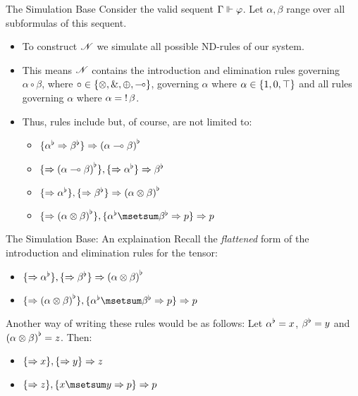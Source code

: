 \documentclass{beamer}
\begin{document}
\begin{frame}{The Simulation Base}
	Consider the valid sequent $\Gamma \Vdash_{ \!\! }^{ \!\! } \varphi$. Let $\alpha, \beta$ range over all subformulas of this sequent.
	\begin{itemize}
		\item To construct $\mathscr{N}$ we simulate all possible ND-rules of our system. 
		\item This means $\mathscr{N}$ contains the introduction and elimination rules governing $\alpha\circ\beta$, where $\circ \in \{\otimes,\mathbin{\&},\oplus,\multimap\}$, governing $\alpha$ where $\alpha \in \{1, 0, \top\}$ and all rules governing $\alpha$ where $\alpha = \mathop{!} \beta$.
		\item Thus, rules include but, of course, are not limited to:
		\begin{itemize}
			\item $\{ {\alpha}^{\flat} \Rightarrow {\beta}^{\flat} \} \Rightarrow {(\alpha \multimap\beta)}^{\flat}$
        	\item $\{ \Rightarrow {(\alpha \multimap\beta)}^{\flat}\}, \{ \Rightarrow {\alpha}^{\flat}\} \Rightarrow {\beta}^{\flat}$
        	\item $\{ \Rightarrow {\alpha}^{\flat}\}, \{\Rightarrow {\beta}^{\flat}\} \Rightarrow {(\alpha \otimes\beta)}^{\flat}$
        	\item $\openaddrule\seq \flatILL{ (\alpha \mand \beta) }\closeaddrule, \openaddrule\flatILL{\alpha}\msetsum \flatILL{\beta} \seq p\closeaddrule \seq p$
		\end{itemize}
	\end{itemize}
\end{frame}
\begin{frame}{The Simulation Base: An explaination}
	Recall the \emph{flattened} form of the introduction and elimination rules for the tensor:
	\begin{itemize}
		\item $\{ \Rightarrow {\alpha}^{\flat}\}, \{\Rightarrow {\beta}^{\flat}\} \Rightarrow {(\alpha \otimes\beta)}^{\flat}$
		\item $\openaddrule\seq \flatILL{ (\alpha \mand \beta) }\closeaddrule, \openaddrule\flatILL{\alpha}\msetsum \flatILL{\beta} \seq p\closeaddrule \seq p$
	\end{itemize}
	\pause
	\vspace{10pt}
	Another way of writing these rules would be as follows: \newline Let ${\alpha}^{\flat}=x$, ${\beta}^{\flat}=y$ and ${ (\alpha \otimes \beta)}^{\flat} = z$. Then:

	\begin{itemize}
		\item $\{ \Rightarrow x\}, \{ \Rightarrow y\} \Rightarrow z$
		\item $\openaddrule\seq z \closeaddrule, \openaddrule x\msetsum y \seq p\closeaddrule \seq p$
	\end{itemize}
\end{frame}
\end{document}
